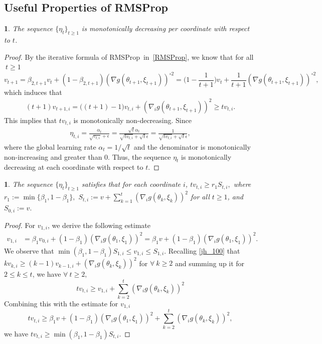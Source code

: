 \documentclass[standalone]{article}
\newtheorem{property}[lem]{\text{Property}}
\begin{document}
\subsection{Useful Properties of RMSProp}
\begin{property}\label{property_0}
The sequence \(\{\eta_t\}_{t\ge 1}\) is monotonically decreasing per coordinate with respect to \( t \).
\end{property}
\begin{proof}
By the iterative formula of RMSProp~in~\cref{RMSProp}, we know that for all $\ t\ge 1$
\[v_{t+1}=\beta_{2,t+1}v_{t}+(1-\beta_{2,t+1})(\nabla g(\theta_{t+1},\xi_{t+1}))^{\circ 2}=\Big(1-\frac{1}{t+1}\Big)v_{t}+\frac{1}{t+1}(\nabla g(\theta_{t+1},\xi_{t+1}))^{\circ 2},\]
which induces that 
\begin{align}\label{jh_100}
(t+1)v_{t+1,i}=\big((t+1)-1\big)v_{t,i}+ (\nabla_i g(\theta_{t+1},\xi_{t+1}))^{2}\ge tv_{t,i}.
\end{align}
This implies that \(tv_{t,i}\) is monotonically non-decreasing. Since
\begin{align*}
\eta_{t,i}=\frac{\alpha_t}{\sqrt{v_{t,i}}+\epsilon}=\frac{\sqrt{t}\alpha_t}{\sqrt{tv_{t,i}}+\sqrt{t}\epsilon}=\frac{1}{\sqrt{tv_{t,i}}+\sqrt{t}\epsilon},
\end{align*} 
where the global learning rate $\alpha_t = 1/\sqrt{t}$ and the denominator is monotonically non-increasing and greater than 0. Thus, the sequence \(\eta_t\) is monotonically decreasing at each coordinate with respect to $t$.  
\end{proof}
\begin{property}\label{property_1}
The sequence \(\{\eta_t\}_{t\ge 1}\) satisfies that for each coordinate $i$, \(tv_{t,i}\ge r_1 S_{t,i},\) where \(r_1:=\min\{\beta_1,1-\beta_1\},\) \(S_{t,i}:=v+\sum_{k=1}^{t}(\nabla_{i}g(\theta_{k},\xi_{k}))^{2}\) for all \( t\ge 1 \), and \(S_{0,i}:=v.\)
\end{property}
\begin{proof}
For $v_{1,i}$, we derive the following estimate
\begin{align*}
v_{1,i} &=\beta_{1}v_{0,i} + (1-\beta_{1})(\nabla_{i}g(\theta_{1},\xi_{1}))^{2} =\beta_{1}v+(1-\beta_1)(\nabla_{i}g(\theta_{1},\xi_{1}))^{2}.
\end{align*}
We observe that $ \min(\beta_1, 1-\beta_1) S_{1,i} \le v_{1,i}\le S_{1,i}.$ Recalling \cref{jh_100} that $kv_{k,i}\ge(k-1)v_{k-1,i}+ (\nabla_{i}g(\theta_{k},\xi_{k}))^{2}$ for $\forall\ k\ge 2$ and summing up it  for $2 \leq k \leq t$, we have $\forall\ t\ge 2,$ $$t v_{t,i}\ge v_{1,i}+\sum_{k=2}^{t}(\nabla_{i}g(\theta_{k},\xi_{k}))^{2}$$
Combining this with the estimate for $v_{1,i}$
\[tv_{t,i}\ge \beta_1 v+ (1-\beta_1)(\nabla_{i}g(\theta_{1},\xi_{1}))^{2}+\sum_{k=2}^{t}(\nabla_{i}g(\theta_{k},\xi_{k}))^{2},\]
we have \( tv_{t,i}\ge \min(\beta_1, 1-\beta_1) S_{t,i}.\) 
\end{proof}
\end{document}
